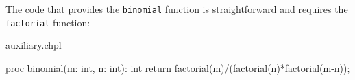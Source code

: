 The code that provides the \lstinline{binomial} function is straightforward 
and requires the \lstinline{factorial} function:
\begin{chapelsource}{auxiliary.chpl}
\begin{chapel}
proc binomial(m: int, n: int): int {
  return factorial(m)/(factorial(n)*factorial(m-n));
}
\end{chapel}
\end{chapelsource}



